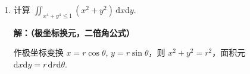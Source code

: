\begin{enumerate}
\textbf{解：}
先对 $y$ 积分，视 $x$ 为常数：
\[
\int_0^x \frac{\mathrm{d}y}{\sqrt{x-y}} = \bigl[-2\sqrt{x-y}\bigr]_{y=0}^{y=x} = 2\sqrt{x}.
\]
于是原式化为
\[
\int_0^1 \frac{2\sqrt{x}}{\sqrt{1-x}}\,\mathrm{d}x = 2\int_0^1 \sqrt{\frac{x}{1-x}}\,\mathrm{d}x.
\]
令 $x = \sin^2 t$，则 $\mathrm{d}x = 2\sin t\cos t\,\mathrm{d}t$，积分限：$x=0$ 对应 $t=0$，$x=1$ 对应 $\displaystyle t=\frac{\pi}{2}$.
代入得：
\begin{align*}
2\int_0^1 \sqrt{\frac{x}{1-x}}\,\mathrm{d}x
&= 2\int_0^{\pi/2} \frac{\sin t}{\cos t}\cdot 2\sin t\cos t\,\mathrm{d}t \\
&= 4\int_0^{\pi/2} \sin^2 t\,\mathrm{d}t
= 4\cdot\frac{\pi}{4} = \pi.
\end{align*}
故答案为 $\underline{\pi}$.

\item 计算 $\displaystyle \iint_{x^4+y^4\le 1}(x^2+y^2)\,\mathrm{d}x\mathrm{d}y$.

\textbf{解：（极坐标换元，二倍角公式）}

作极坐标变换 $x=r\cos\theta$, $y=r\sin\theta$，则 $x^2+y^2=r^2$，面积元 $\mathrm{d}x\mathrm{d}y=r\,\mathrm{d}r \mathrm{d}\theta$.


\end{enumerate}
